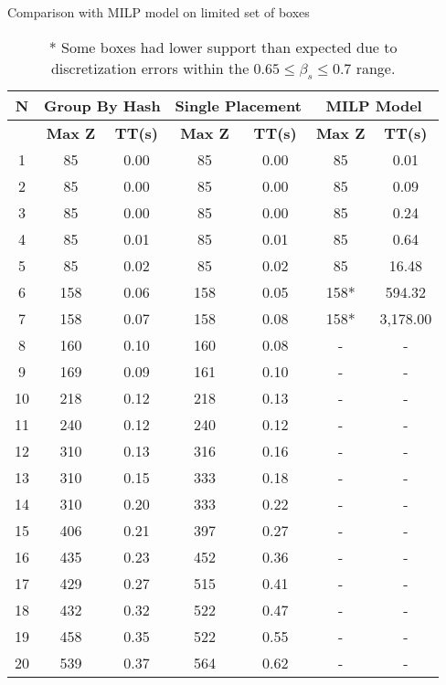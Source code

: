 \begin{table}[htbp]
    \centering
    \caption{Comparison with MILP model on limited set of boxes}
    \begin{tabular}{|c|c|c|c|c|c|c|}
    \hline
    \textbf{N} & \multicolumn{ 2}{c|}{\textbf{Group By Hash}} & \multicolumn{ 2}{c|}{\textbf{Single Placement}} & \multicolumn{ 2}{c|}{\textbf{MILP Model}} \\ \hline
    \multicolumn{1}{|l|}{} & \textbf{Max Z} & \textbf{TT(s)} & \textbf{Max Z} & \textbf{TT(s)} & \textbf{Max Z} & \textbf{TT(s)} \\ \hline
    1 & 85 & 0.00 & 85 & 0.00 & 85 & 0.01 \\ 
    2 & 85 & 0.00 & 85 & 0.00 & 85 & 0.09 \\ 
    3 & 85 & 0.00 & 85 & 0.00 & 85 & 0.24 \\ 
    4 & 85 & 0.01 & 85 & 0.01 & 85 & 0.64 \\ 
    5 & 85 & 0.02 & 85 & 0.02 & 85 & 16.48 \\ 
    6 & 158 & 0.06 & 158 & 0.05 & 158* & 594.32 \\ 
    7 & 158 & 0.07 & 158 & 0.08 & 158* & 3,178.00 \\ \hline
    8 & 160 & 0.10 & 160 & 0.08 & - & - \\ 
    9 & 169 & 0.09 & 161 & 0.10 & - & - \\ 
    10 & 218 & 0.12 & 218 & 0.13 & - & - \\ 
    11 & 240 & 0.12 & 240 & 0.12 & - & - \\ 
    12 & 310 & 0.13 & 316 & 0.16 & - & - \\ 
    13 & 310 & 0.15 & 333 & 0.18 & - & - \\ 
    14 & 310 & 0.20 & 333 & 0.22 & - & - \\ 
    15 & 406 & 0.21 & 397 & 0.27 & - & - \\ 
    16 & 435 & 0.23 & 452 & 0.36 & - & - \\ 
    17 & 429 & 0.27 & 515 & 0.41 & - & - \\ 
    18 & 432 & 0.32 & 522 & 0.47 & - & - \\ 
    19 & 458 & 0.35 & 522 & 0.55 & - & - \\ 
    20 & 539 & 0.37 & 564 & 0.62 & - & - \\ \hline
    \end{tabular}
    \label{exp:model}
    \caption*{* Some boxes had lower support than expected due to discretization errors within the $ 0.65 \le \beta_s \le 0.7$ range.}
    \end{table}
